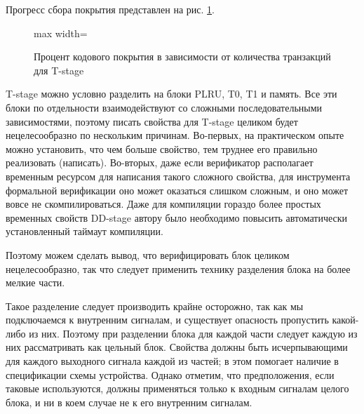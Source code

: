 \tab Прогресс сбора покрытия представлен на рис. \ref{fig:cov_t}.

\begin{figure}[h]
	\centering
		\begin{adjustbox}{max width=\textwidth}
		\end{adjustbox}
		\caption{Процент кодового покрытия в зависимости от количества транзакций для T-stage}
		\label{fig:cov_t}
\end{figure}

T-stage можно условно разделить на блоки PLRU, T0, T1 и память. Все эти блоки по отдельности взаимодействуют со сложными последовательными зависимостями, поэтому писать свойства для T-stage целиком будет нецелесообразно по нескольким причинам. Во-первых, на практическом опыте можно установить, что чем больше свойство, тем труднее его правильно реализовать (написать). Во-вторых, даже если верификатор располагает временным ресурсом для написания такого сложного свойства, для инструмента формальной верификации оно может оказаться слишком сложным, и оно может вовсе не скомпилироваться. Даже для компиляции гораздо более простых временных свойств DD-stage автору было необходимо повысить автоматически установленный таймаут компиляции.

Поэтому можем сделать вывод, что верифицировать блок целиком нецелесообразно, так что следует применить технику разделения блока на более мелкие части. 

Такое разделение следует производить крайне осторожно, так как мы подключаемся к внутренним сигналам, и существует опасность пропустить какой-либо из них. Поэтому при разделении блока для каждой части следует каждую из них рассматривать как цельный блок. Свойства должны быть исчерпывающими для каждого выходного сигнала каждой из частей; в этом помогает наличие в спецификации схемы устройства. Однако отметим, что предположения, если таковые используются, должны применяться только к входным сигналам целого блока, и ни в коем случае не к его внутренним сигналам. 

